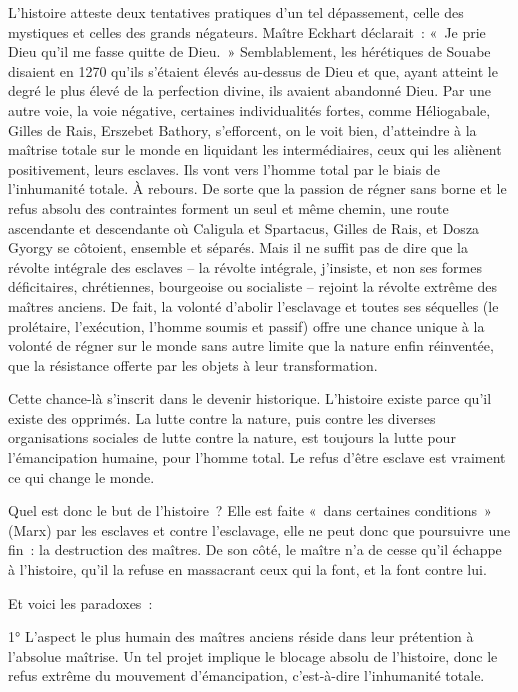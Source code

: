 \documentclass[french,twoside]{book} %
\begin{document}
L’histoire atteste deux tentatives pratiques d’un tel dépassement, celle des mystiques et celles des grands négateurs. Maître Eckhart déclarait : « Je prie Dieu qu’il me fasse quitte de Dieu. » Semblablement, les hérétiques de Souabe disaient en 1270 qu’ils s’étaient élevés au-dessus de Dieu et que, ayant atteint le degré le plus élevé de la perfection divine, ils avaient abandonné Dieu. Par une autre voie, la voie négative, certaines individualités fortes, comme Héliogabale, Gilles de Rais, Erszebet Bathory, s’efforcent, on le voit bien, d’atteindre à la maîtrise totale sur le monde en liquidant les intermédiaires, ceux qui les aliènent positivement, leurs esclaves. Ils vont vers l’homme total par le biais de l’inhumanité totale. À rebours. De sorte que la passion de régner sans borne et le refus absolu des contraintes forment un seul et même chemin, une route ascendante et descendante où Caligula et Spartacus, Gilles de Rais, et Dosza Gyorgy se côtoient, ensemble et séparés. Mais il ne suffit pas de dire que la révolte intégrale des esclaves – la révolte intégrale, j’insiste, et non ses formes déficitaires, chrétiennes, bourgeoise ou socialiste – rejoint la révolte extrême des maîtres anciens. De fait, la volonté d’abolir l’esclavage et toutes ses séquelles (le prolétaire, l’exécution, l’homme soumis et passif) offre une chance unique à la volonté de régner sur le monde sans autre limite que la nature enfin réinventée, que la résistance offerte par les objets à leur transformation.\par
Cette chance-là s’inscrit dans le devenir historique. L’histoire existe parce qu’il existe des opprimés. La lutte contre la nature, puis contre les diverses organisations sociales de lutte contre la nature, est toujours la lutte pour l’émancipation humaine, pour l’homme total. Le refus d’être esclave est vraiment ce qui change le monde.\par
Quel est donc le but de l’histoire ? Elle est faite « dans certaines conditions » (Marx) par les esclaves et contre l’esclavage, elle ne peut donc que poursuivre une fin : la destruction des maîtres. De son côté, le maître n’a de cesse qu’il échappe à l’histoire, qu’il la refuse en massacrant ceux qui la font, et la font contre lui.\par
Et voici les paradoxes :\par
1° L’aspect le plus humain des maîtres anciens réside dans leur prétention à l’absolue maîtrise. Un tel projet implique le blocage absolu de l’histoire, donc le refus extrême du mouvement d’émancipation, c’est-à-dire l’inhumanité totale.\par
\end{document}
